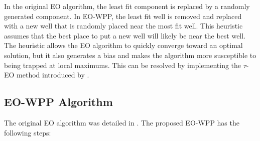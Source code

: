 \documentclass[authoryear]{elsarticle}
\begin{document}
In the original EO algorithm, the least fit component is replaced by a randomly generated component. In EO-WPP, the least fit well is removed and replaced with a new well that is randomly placed near the most fit well. This heuristic assumes that the best place to put a new well will likely be near the best well. The heuristic allows the EO algorithm to quickly converge toward an optimal solution, but it also generates a bias and makes the algorithm more susceptible to being trapped at local maximums. This can be resolved by implementing the $\tau$-EO method introduced by \cite{boettcher1999extremal}.




\subsection{EO-WPP Algorithm}
The original EO algorithm was detailed in \citet{boettcher1999extremal}. The proposed EO-WPP has the following steps:
\end{document}
